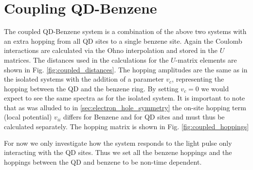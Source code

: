 \section{Coupling QD-Benzene}
    The coupled QD-Benzene system is a combination of the above two systems with an extra hopping from all QD sites to a single benzene site. Again the Coulomb interactions are calculated via the Ohno interpolation and stored in the $U$ matrices. The distances used in the calculations for the $U$-matrix elements are shown in Fig. \ref{fig:coupled_distances}. The hopping amplitudes are the same as in the isolated systems with the addition of a parameter $v_c$, representing the hopping between the QD and the benzene ring. By setting $v_c = 0$ we would expect to see the same spectra as for the isolated system. It is important to note that as was alluded to in \ref{sec:electron_hole_symmetry} the on-site hopping term (local potential) $v_{ii}$ differs for Benzene and for QD sites and must thus be calculated separately. The hopping matrix is shown in Fig. \ref{fig:coupled_hoppings}
    \medskip
    
    For now we only investigate how the system responds to the light pulse only interacting with the QD sites. Thus we set all the benzene hoppings and the hoppings between the QD and benzene to be non-time dependent.

\usetikzlibrary{matrix, positioning}

\newcommand{\my}{|[fill=myellow]|}
\renewcommand{\mg}{|[fill=mgreen]|}



